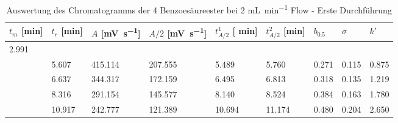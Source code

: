 \documentclass{article}
\begin{document}
 \begin{table}[ht!]
  \centering
 \begin{tabularx}{\textwidth}{XXXXXXXXX}
 $t_m $ [\si{\minute}] & $t_r$ [\si{\minute}] & $A$ [\si{\milli\volt\per\second}] & $A/2$ [\si{\milli\volt\per\second}] & $t_{A/2}^1$ [ \si{\minute}] & $t_{A/2}^2$  [\si{\minute}] &
 $b_{0.5}$ & $\sigma$ & $k'$\\
\hline
2.991 &&&&&&&& \\
 ~ & 5.607 & 415.114 & 207.555 & 5.489 & 5.760 & 0.271 & 0.115 & 0.875\\
 & 6.637  & 344.317 & 172.159 & 6.495 & 6.813 & 0.318  & 0.135 & 1.219\\
 & 8.316  & 291.154 & 145.577 & 8.140 & 8.524  & 0.384 & 0.163 & 1.780\\
 & 10.917 & 242.777 & 121.389 & 10.694 &11.174 & 0.480 & 0.204 & 2.650\\
\end{tabularx}
   \renewcommand\thetable{2}
  \caption{Auswertung des Chromatogramms der 4 Benzoesäureester bei 2 \si{\milli\liter\per\minute} Flow - Erste Durchführung}
\end{table}
\end{document}
